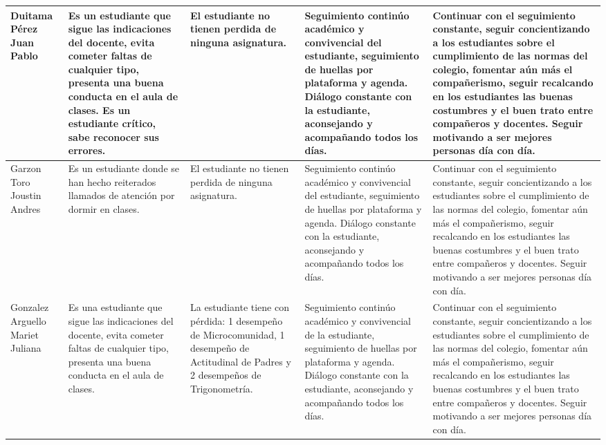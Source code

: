 \documentclass[spanish,11pt,a4paper]{article}
\begin{document}
\begin{longtable}{|p{3.5cm}|p{3.5cm}|p{3.5cm}|p{3.5cm}|p{3.5cm}|}
		Duitama Pérez Juan Pablo & 
		Es un estudiante que sigue las indicaciones del docente, evita cometer faltas de cualquier tipo, presenta una buena conducta en el aula de clases. Es un estudiante crítico, sabe reconocer sus errores. & 
		El estudiante no tienen perdida de ninguna asignatura. & 
		Seguimiento continúo académico y convivencial del estudiante, seguimiento de huellas por plataforma y agenda. Diálogo constante con la estudiante, aconsejando y acompañando todos los días. & 
		Continuar con el seguimiento constante, seguir concientizando a los estudiantes sobre el cumplimiento de las normas del colegio, fomentar aún más el compañerismo, seguir recalcando en los estudiantes las buenas costumbres y el buen trato entre compañeros y docentes. Seguir motivando a ser mejores personas día con día.\\
		\hline
		
		Garzon Toro Joustin Andres & 
		Es un estudiante donde se han hecho reiterados llamados de atención por dormir en clases. & 
		El estudiante no tienen perdida de ninguna asignatura.  & 
		Seguimiento continúo académico y convivencial del estudiante, seguimiento de huellas por plataforma y agenda. Diálogo constante con la estudiante, aconsejando y acompañando todos los días. & 
		Continuar con el seguimiento constante, seguir concientizando a los estudiantes sobre el cumplimiento de las normas del colegio, fomentar aún más el compañerismo, seguir recalcando en los estudiantes las buenas costumbres y el buen trato entre compañeros y docentes. Seguir motivando a ser mejores personas día con día.\\
		\hline
		
		Gonzalez Arguello Mariet Juliana & 
		Es una estudiante que sigue las indicaciones del docente, evita cometer faltas de cualquier tipo, presenta una buena conducta en el aula de clases. & 
		La estudiante tiene con pérdida: 1 desempeño de Microcomunidad, 1 desempeño de Actitudinal de Padres y 2 desempeños de Trigonometría. & 
		Seguimiento continúo académico y convivencial de la estudiante, seguimiento de huellas por plataforma y agenda. Diálogo constante con la estudiante, aconsejando y acompañando todos los días. & 
		Continuar con el seguimiento constante, seguir concientizando a los estudiantes sobre el cumplimiento de las normas del colegio, fomentar aún más el compañerismo, seguir recalcando en los estudiantes las buenas costumbres y el buen trato entre compañeros y docentes. Seguir motivando a ser mejores personas día con día.\\
		\hline
		

\end{longtable}
\end{document}
